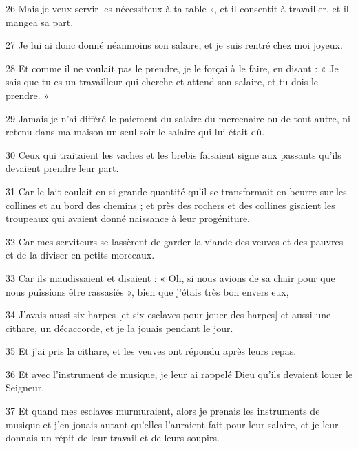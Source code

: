 \par 26 Mais je veux servir les nécessiteux à ta table », et il consentit à travailler, et il mangea sa part.

\par 27 Je lui ai donc donné néanmoins son salaire, et je suis rentré chez moi joyeux.

\par 28 Et comme il ne voulait pas le prendre, je le forçai à le faire, en disant : « Je sais que tu es un travailleur qui cherche et attend son salaire, et tu dois le prendre. »

\par 29 Jamais je n'ai différé le paiement du salaire du mercenaire ou de tout autre, ni retenu dans ma maison un seul soir le salaire qui lui était dû.

\par 30 Ceux qui traitaient les vaches et les brebis faisaient signe aux passants qu'ils devaient prendre leur part.

\par 31 Car le lait coulait en si grande quantité qu'il se transformait en beurre sur les collines et au bord des chemins ; et près des rochers et des collines gisaient les troupeaux qui avaient donné naissance à leur progéniture.

\par 32 Car mes serviteurs se lassèrent de garder la viande des veuves et des pauvres et de la diviser en petits morceaux.

\par 33 Car ils maudissaient et disaient : « Oh, si nous avions de sa chair pour que nous puissions être rassasiés », bien que j'étais très bon envers eux,

\par 34 J'avais aussi six harpes [et six esclaves pour jouer des harpes] et aussi une cithare, un décaccorde, et je la jouais pendant le jour.

\par 35 Et j'ai pris la cithare, et les veuves ont répondu après leurs repas.

\par 36 Et avec l'instrument de musique, je leur ai rappelé Dieu qu'ils devaient louer le Seigneur.

\par 37 Et quand mes esclaves murmuraient, alors je prenais les instruments de musique et j'en jouais autant qu'elles l'auraient fait pour leur salaire, et je leur donnais un répit de leur travail et de leurs soupirs.

